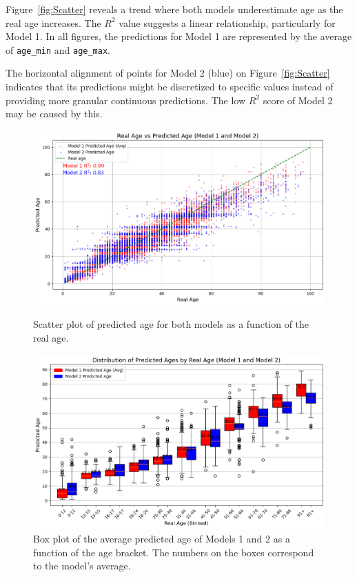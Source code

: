 \documentclass{article}
\begin{document}
Figure~\ref{fig:Scatter} reveals a trend where both models underestimate age as the real age increases. The $R^2$ value suggests a linear relationship, particularly for Model 1. In all figures, the predictions for Model 1 are represented by the average of \texttt{age\_min} and \texttt{age\_max}. 

The horizontal alignment of points for Model 2 (blue) on Figure~\ref{fig:Scatter} indicates that its predictions might be discretized to specific values instead of providing more granular continuous predictions. The low $R^2$ score of Model 2 may be caused by this.


\begin{figure}[h]
    \centering
    \begin{minipage}{0.49\textwidth}
        \centering
        \includegraphics[width=\textwidth]{images/0_Scatter_Real_vs_prediction_Refined_dropNan_A.png}
        \caption{Scatter plot of predicted age for both models as a function of the real age.}
        \label{fig:Scatter}
    \end{minipage}
    \hfill
    \begin{minipage}{0.49\textwidth}
        \centering
        \includegraphics[width=\textwidth]{images/3_Box_Real_vs_prediction_dorpnan_DensePlotGrid.png}
        \caption{Box plot of the average predicted age of Models 1 and 2 as a function of the age bracket. The numbers on the boxes correspond to the model's average.}
        \label{fig:Box}
    \end{minipage}
\end{figure}
\end{document}

